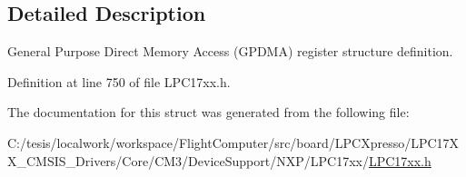 \subsection{\-Detailed \-Description}
\-General \-Purpose \-Direct \-Memory \-Access (\-G\-P\-D\-M\-A) register structure definition. 

\-Definition at line 750 of file \-L\-P\-C17xx.\-h.



\-The documentation for this struct was generated from the following file\-:\begin{DoxyCompactItemize}
\item 
\-C\-:/tesis/localwork/workspace/\-Flight\-Computer/src/board/\-L\-P\-C\-Xpresso/\-L\-P\-C17\-X\-X\-\_\-\-C\-M\-S\-I\-S\-\_\-\-Drivers/\-Core/\-C\-M3/\-Device\-Support/\-N\-X\-P/\-L\-P\-C17xx/\hyperlink{_l_p_c17xx_8h}{\-L\-P\-C17xx.\-h}\end{DoxyCompactItemize}
